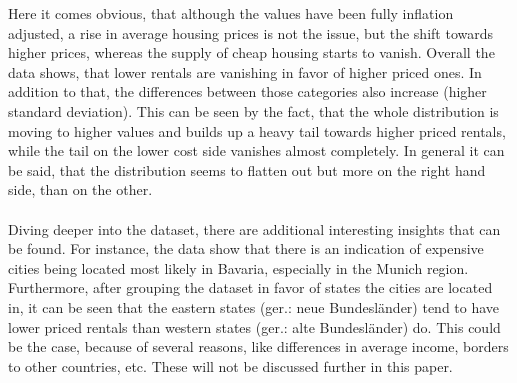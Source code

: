 \documentclass{article}
\begin{document}
	Here it comes obvious, that although the values have been fully inflation adjusted, a rise in average housing prices is not the issue, but the shift towards higher prices, whereas the supply of cheap housing starts to vanish. Overall the data shows, that lower rentals are vanishing in favor of higher priced ones. In addition to that, the differences between those categories also increase (higher standard deviation). This can be seen by the fact, that the whole distribution is moving to higher values and builds up a heavy tail towards higher priced rentals, while the tail on the lower cost side vanishes almost completely. In general it can be said, that the distribution seems to flatten out but more on the right hand side, than on the other.
\\\\
	Diving deeper into the dataset, there are additional interesting insights that can be found. For instance, the data show that there is an indication of expensive cities being located most likely in Bavaria, especially in the Munich region. Furthermore, after grouping the dataset in favor of states the cities are located in, it can be seen that the eastern states (ger.: neue Bundesländer) tend to have lower priced rentals than western states (ger.: alte Bundesländer) do. This could be the case, because of several reasons, like differences in average income, borders to other countries, etc. These will not be discussed further in this paper.
\end{document}
